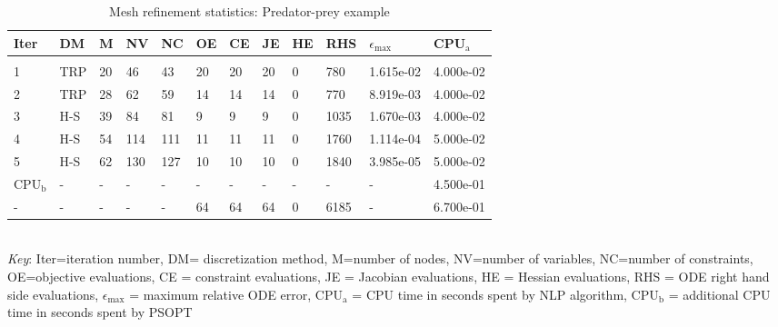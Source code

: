 
\begin{table}
\caption{Mesh refinement statistics: Predator-prey example}
\label{mesh_stats_predator}
\renewcommand{\tabcolsep}{0.15cm}
\tiny
\begin{tabular}{llllllllllll}
Iter&DM&M&NV&NC&OE&CE&JE&HE&RHS&$\epsilon_{\max}$&CPU$_\mathrm{a}$ \\ \hline \\
1&TRP&20&46&43&20&20&20&0&780&1.615e-02&4.000e-02\\
2&TRP&28&62&59&14&14&14&0&770&8.919e-03&4.000e-02\\
3&H-S&39&84&81&9&9&9&0&1035&1.670e-03&4.000e-02\\
4&H-S&54&114&111&11&11&11&0&1760&1.114e-04&5.000e-02\\
5&H-S&62&130&127&10&10&10&0&1840&3.985e-05&5.000e-02\\
\hline
CPU$_\mathrm{b}$ &-&-&-&-&-&-&-&-&-&-&4.500e-01\\
-&-&-&-&-&64&64&64&0&6185&-&6.700e-01\\
\end{tabular}
\newline \\ \emph{Key}: Iter=iteration number, DM= discretization method, M=number of nodes, NV=number of variables, NC=number of constraints, OE=objective evaluations,  	              CE = constraint evaluations, JE = Jacobian evaluations, HE = Hessian evaluations, RHS = ODE right hand side 		      evaluations, $\epsilon_{\max}$ = maximum relative ODE error, CPU$_\mathrm{a}$ = CPU time in seconds spent by NLP algorithm, 		      CPU$_\mathrm{b}$ = additional CPU time in seconds spent by PSOPT
\normalsize
\end{table}